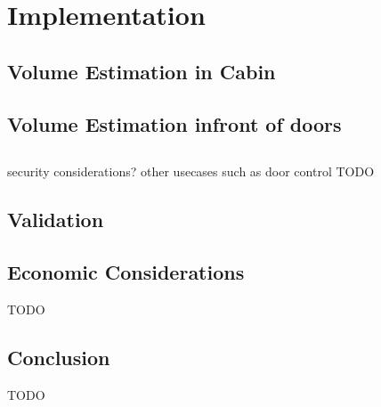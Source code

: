 \chapter{Implementation}
\label{chap:impl}

\section{Volume Estimation in Cabin}

\section{Volume Estimation infront of doors}

\section{}

security considerations?
other usecases such as door control
TODO

\section{Validation}

\section{Economic Considerations}

TODO

\section{Conclusion}

TODO